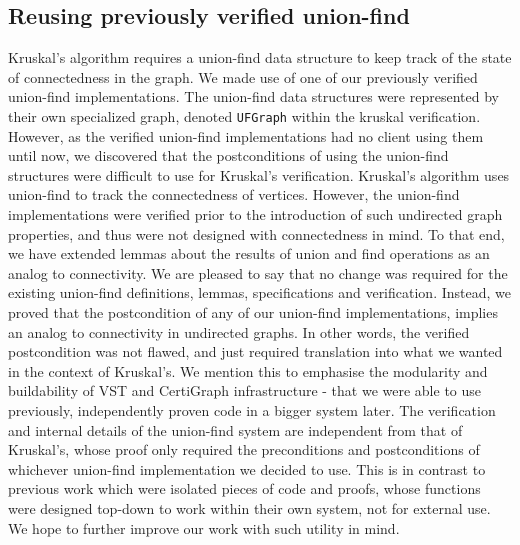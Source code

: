 \subsection{Reusing previously verified union-find} %
Kruskal's algorithm requires a union-find data structure to keep track of the state of connectedness in the graph. We made use of one of our previously verified union-find implementations. The union-find data structures were represented by their own specialized graph, denoted \texttt{UFGraph} within the kruskal verification.
\newline\newline
However, as the verified union-find implementations had no client using them until now, we discovered that the postconditions of using the union-find structures were difficult to use for Kruskal's verification. Kruskal's algorithm uses union-find to track the connectedness of vertices. However, the union-find implementations were verified prior to the introduction of such undirected graph properties, and thus were not designed with connectedness in mind. To that end, we have extended lemmas about the results of union and find operations as an analog to connectivity.
\newline\newline
We are pleased to say that no change was required for the existing union-find definitions, lemmas, specifications and verification. Instead, we proved that the postcondition of any of our union-find implementations, implies an analog to connectivity in undirected graphs. In other words, the verified postcondition was not flawed, and just required translation into what we wanted in the context of Kruskal's.
\newline\newline
We mention this to emphasise the modularity and buildability of VST and CertiGraph infrastructure - that we were able to use previously, independently proven code in a bigger system later. The verification and internal details of the union-find system are independent from that of Kruskal's, whose proof only required the preconditions and postconditions of whichever union-find implementation we decided to use. This is in contrast to previous work which were isolated pieces of code and proofs, whose functions were designed top-down to work within their own system, not for external use. We hope to further improve our work with such utility in mind.